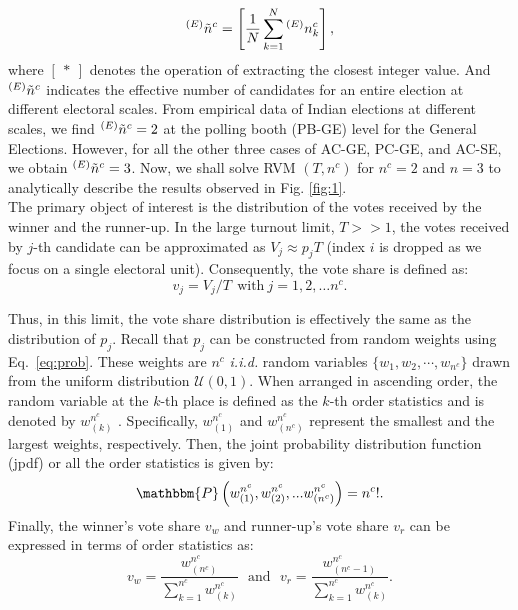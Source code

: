 \begin{equation}
    ^{(E)}\Tilde{n}^c =  \left[\frac{1}{N}\sum_{k=1}^{N}{}^{(E)}n^{c}_k \right],
\end{equation}
where $\left[\:*\:\right]$ denotes the operation of extracting the closest integer value. And $^{(E)}\Tilde{n}^c $ indicates the effective number of candidates for an entire election at different electoral scales. From empirical data of Indian elections at different scales, we find $^{(E)}\Tilde{n}^c = 2$ at the polling booth (PB-GE) level for the General Elections. However, for all the other three cases of AC-GE, PC-GE, and AC-SE, we obtain $^{(E)}\Tilde{n}^c = 3$. Now, we shall solve RVM $(T, n^c)$ for $n^c = 2$ and $n = 3$ to analytically describe the results observed in Fig. \ref{fig:1}.\\

The primary object of interest is the distribution of the votes received by the winner and the runner-up. In the large turnout limit, $T >> 1$, the votes received by $j$-th candidate can be approximated as $V_j \approx p_j T$ (index $i$ is dropped as we focus on a single electoral unit). Consequently, the vote share is defined as:
\begin{equation}
    v_j = V_j/T ~~ \text{with} ~ j = 1, 2, \dots n^c.
    \label{eq:voteshare}
\end{equation}

Thus, in this limit, the vote share distribution is effectively the same as the distribution of $p_j$. Recall that $p_j$ can be constructed from random weights using Eq.~\ref{eq:prob}. These weights are $n^c$ \emph{i.i.d.} random variables $\{w_1, w_2, \cdots, w_{n^c}\}$ drawn from the uniform distribution $\mathcal{U}(0, 1)$. When arranged in ascending order, the random variable at the $k$-th place is defined as the $k$-th order statistics and is denoted by $w^{n^c}_{(k)}$ \cite{BarBalNag2008}. Specifically, $w^{n^c}_{(1)}$ and $w^{n^c}_{(n^c)}$ represent the smallest and the largest weights, respectively. Then, the joint probability distribution function (jpdf) or all the order statistics is given by:
\begin{equation}
    \mathbbm{P}\left(w^{n^c}_{(1)}, w^{n^c}_{(2)}, ... w^{n^c}_{(n^c)}\right) = n^c!.
    \label{eq:jpdf1}
\end{equation}
Finally, the winner's vote share $v_w$ and runner-up's vote share $v_r$ can be expressed in terms of order statistics as:
\begin{equation}
    v_w = \frac{w^{n^c}_{(n^c)}}{\sum_{k = 1}^{n^c}w^{n^c}_{(k)}} ~~~\text{and}~~~ v_r = \frac{w^{n^c}_{(n^c - 1)}}{\sum_{k = 1}^{n^c}w^{n^c}_{(k)}}.
    \label{eq:voteshare_order_stat}
\end{equation}

